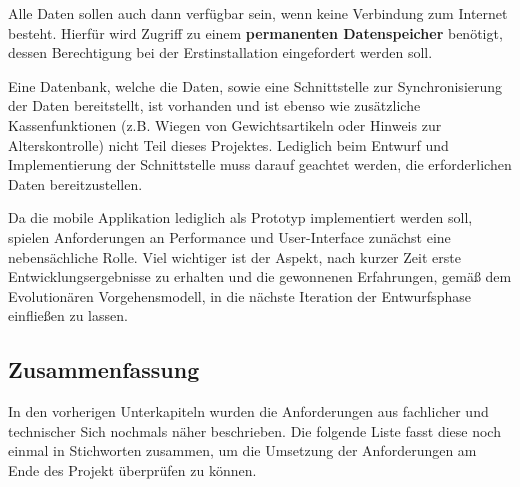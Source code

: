Alle Daten sollen auch dann verfügbar sein, wenn keine Verbindung zum Internet besteht. Hierfür wird Zugriff zu einem \textbf{permanenten Datenspeicher} benötigt, dessen Berechtigung bei der Erstinstallation eingefordert werden soll.

Eine Datenbank, welche die Daten, sowie eine Schnittstelle zur Synchronisierung der Daten bereitstellt, ist vorhanden und ist ebenso wie zusätzliche Kassenfunktionen (z.B. Wiegen von Gewichtsartikeln oder Hinweis zur Alterskontrolle) nicht Teil dieses Projektes. Lediglich beim Entwurf und Implementierung der Schnittstelle muss darauf geachtet werden, die erforderlichen Daten bereitzustellen.

Da die mobile Applikation lediglich als Prototyp implementiert werden soll, spielen Anforderungen an Performance und User-Interface zunächst eine nebensächliche Rolle. Viel wichtiger ist der Aspekt, nach kurzer Zeit erste Entwicklungsergebnisse zu erhalten und die gewonnenen Erfahrungen, gemäß dem Evolutionären Vorgehensmodell, in die nächste Iteration der Entwurfsphase einfließen zu lassen.

\subsection{Zusammenfassung}
In den vorherigen Unterkapiteln wurden die Anforderungen aus fachlicher und technischer Sich nochmals näher beschrieben. Die folgende Liste fasst diese noch einmal in Stichworten zusammen, um die Umsetzung der Anforderungen am Ende des Projekt überprüfen zu können.

